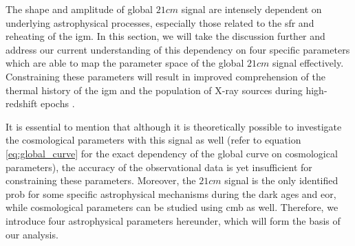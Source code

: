 \documentclass[%
 reprint,
 amsmath,amssymb,
 aps,
]{revtex4-2}
\begin{document}
The shape and amplitude of global $21cm$ signal are intensely dependent on underlying astrophysical processes, especially those related to the \gls{sfr} and reheating of the \gls{igm}. In this section, we will take the discussion further and address our current understanding of this dependency on four specific parameters which are able to map the parameter space of the global $21cm$ signal effectively. Constraining these parameters will result in improved comprehension of the thermal history of the \gls{igm} and the population of X-ray sources during high-redshift epochs \cite{21century}.\par
It is essential to mention that although it is theoretically possible to investigate the cosmological parameters with this signal as well (refer to equation \ref{eq:global_curve} for the exact dependency of the global curve on cosmological parameters), the accuracy of the observational data is yet insufficient for constraining these parameters. Moreover, the $21cm$ signal is the only identified prob for some specific astrophysical mechanisms during the dark ages and \gls{eor}, while cosmological parameters can be studied using \gls{cmb} as well. Therefore, we introduce four astrophysical parameters hereunder, which will form the basis of our analysis. \par
\end{document}
